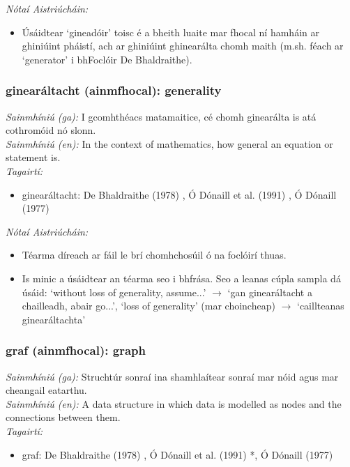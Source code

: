  \noindent \textit{Nótaí Aistriúcháin:}
\begin{itemize}
	\item Úsáidtear `gineadóir' toisc é a bheith luaite mar fhocal ní hamháin ar ghiniúint pháistí, ach ar ghiniúint ghinearálta chomh maith (m.sh. féach ar `generator' i bhFoclóir De Bhaldraithe).
\end{itemize}


\subsubsection*{ginearáltacht (ainmfhocal): generality}
 \noindent \textit{Sainmhíniú (ga):} I gcomhthéacs matamaitice, cé chomh ginearálta is atá cothromóid nó slonn.
\\
 \noindent \textit{Sainmhíniú (en):} In the context of mathematics, how general an equation or statement is.
\\
 \noindent \textit{Tagairtí:}
\begin{itemize}
	\item ginearáltacht: De Bhaldraithe (1978) \cite{de-bhaldraithe}, Ó Dónaill et al. (1991) \cite{focloir-beag}, Ó Dónaill (1977) \cite{odonaill}
\end{itemize}

 \noindent \textit{Nótaí Aistriúcháin:}
\begin{itemize}
	\item Téarma díreach ar fáil le brí chomhchosúil ó na foclóirí thuas.
	\item Is minic a úsáidtear an téarma seo i bhfrása. Seo a leanas cúpla sampla dá úsáid: `without loss of generality, assume...' $\rightarrow$ `gan ginearáltacht a chailleadh, abair go...', `loss of generality' (mar choincheap) $\rightarrow$ `caillteanas ginearáltachta'
\end{itemize}


\subsubsection*{graf (ainmfhocal): graph}
 \noindent \textit{Sainmhíniú (ga):} Struchtúr sonraí ina shamhlaítear sonraí mar nóid agus mar cheangail eatarthu.
\\
 \noindent \textit{Sainmhíniú (en):} A data structure in which data is modelled as nodes and the connections between them.
\\
 \noindent \textit{Tagairtí:}
\begin{itemize}
	\item graf: De Bhaldraithe (1978) \cite{de-bhaldraithe}, Ó Dónaill et al. (1991) \cite{focloir-beag}*, Ó Dónaill (1977) \cite{odonaill}
\end{itemize}

